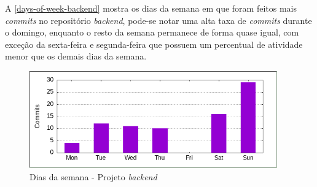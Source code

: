 A \autoref{days-of-week-backend} mostra os dias da semana em que foram feitos mais \textit{commits} no repositório \textit{\gls{backend}}, pode-se notar uma alta taxa de \textit{commits} durante o domingo, enquanto o resto da semana permanece de forma quase igual, com exceção da sexta-feira e segunda-feira que possuem um percentual de atividade menor que os demais dias da semana.
\begin{figure}[H]
	\centering
	\caption{\label{days-of-week-backend}Dias da semana - Projeto \textit{\gls{backend}}}
	\includegraphics[width=0.95\textwidth]{../imagens/stats/days-of-week-backend.png}
\end{figure}